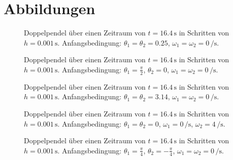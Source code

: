 \documentclass[10pt,a4paper]{article}
\begin{document}
\appendix
\section{Abbildungen}
\begin{figure}[htbp]
\centering
\scalebox{0.85}{}
\caption{Doppelpendel über einen Zeitraum von $t = \num{16.4} \, \si{\second}$ in Schritten von $h = \num{0.001} \, \si{\second}$. Anfangsbedingung: $\theta_1 = \theta_2 = \num{0.25}$, $\omega_1 = \omega_2 = \num{0} \, \si{\per\second}$.}
\label{fig1}
\end{figure}

\begin{figure}[htbp]
\centering
\scalebox{0.85}{}
\caption{Doppelpendel über einen Zeitraum von $t = \num{16.4} \, \si{\second}$ in Schritten von $h = \num{0.001} \, \si{\second}$. Anfangsbedingung: $\theta_1 = \frac{\pi}{2}$, $\theta_2 = \num{0}$, $\omega_1 = \omega_2 = \num{0} \, \si{\per\second}$.}
\label{fig2}
\end{figure}

\begin{figure}[htbp]
\centering
\scalebox{0.85}{}
\caption{Doppelpendel über einen Zeitraum von $t = \num{16.4} \, \si{\second}$ in Schritten von $h = \num{0.001} \, \si{\second}$. Anfangsbedingung: $\theta_1 = \theta_2 = \num{3.14}$, $\omega_1 = \omega_2 = \num{0} \, \si{\per\second}$.}
\label{fig3}
\end{figure}

\begin{figure}[htbp]
\centering
\scalebox{0.85}{}
\caption{Doppelpendel über einen Zeitraum von $t = \num{16.4} \, \si{\second}$ in Schritten von $h = \num{0.001} \, \si{\second}$. Anfangsbedingung: $\theta_1 = \theta_2 = \num{0}$, $\omega_1 = \num{0} \, \si{\per\second}$, $\omega_2 = \num{4} \, \si{\per\second}$.}
\label{fig4}
\end{figure}

\begin{figure}[htbp]
\centering
\scalebox{0.85}{}
\caption{Doppelpendel über einen Zeitraum von $t = \num{16.4} \, \si{\second}$ in Schritten von $h = \num{0.001} \, \si{\second}$. Anfangsbedingung: $\theta_1 = \frac{\pi}{4}$, $\theta_2 = -\frac{\pi}{4}$, $\omega_1 = \omega_2 = \num{0} \, \si{\per\second}$.}
\label{fig5}
\end{figure}
\end{document}
